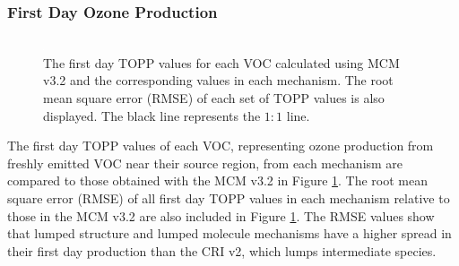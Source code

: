 \subsubsection{First Day Ozone Production} \label{sss:day1} %
%
\begin{figure}
    \centering
    \includegraphics[width=\textwidth]{img/first_day_values}
    \vspace{1mm}
    \caption{The first day TOPP values for each VOC calculated using MCM v3.2 and the corresponding values in each mechanism. The root mean square error (RMSE) of each set of TOPP values is also displayed. The black line represents the $1:1$ line.}
    \vspace{-4mm}
    \label{f:first_day}
\end{figure}
%
The first day TOPP values of each VOC, representing ozone production from freshly emitted VOC near their source region, from each mechanism are compared to those obtained with the MCM v3.{2} in Figure \ref{f:first_day}.
The root mean square error (RMSE) of all first day TOPP values in each mechanism relative to those in the MCM v3.2 are also included in Figure \ref{f:first_day}.  
The RMSE values show that lumped structure and lumped molecule mechanisms have a higher spread in their first day  production than the CRI v2, which lumps intermediate species.

